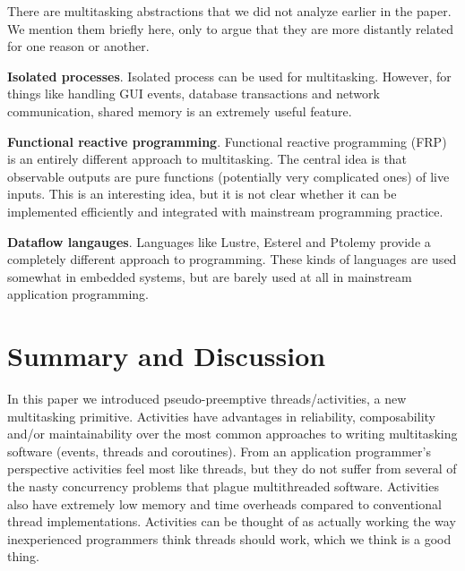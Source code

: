 \documentclass[9pt,preprint]{sigplanconf}
\begin{document}
There are multitasking abstractions that we did not analyze earlier in the paper.
We mention them briefly here, only to argue that they are more distantly related for one reason or another.

\textbf{Isolated processes}.
Isolated process can be used for multitasking.
However, for things like handling GUI events, database transactions and network communication, shared memory is an extremely useful feature.

\textbf{Functional reactive programming}.
Functional reactive programming (FRP) is an entirely different approach to multitasking.
The central idea is that observable outputs are pure functions (potentially very complicated ones) of live inputs.
This is an interesting idea, but it is not clear whether it can be implemented efficiently and integrated with mainstream programming practice.

\textbf{Dataflow langauges}.
Languages like Lustre, Esterel and Ptolemy provide a completely different approach to programming.
These kinds of languages are used somewhat in embedded systems, but are barely used at all in mainstream application programming.

\section{Summary and Discussion}

In this paper we introduced pseudo-preemptive threads/activities, a new multitasking primitive.
Activities have advantages in reliability, composability and/or maintainability over the most common approaches to writing multitasking software (events, threads and coroutines).
From an application programmer's perspective activities feel most like threads, but they do not suffer from several of the nasty concurrency problems that plague multithreaded software.
Activities also have extremely low memory and time overheads compared to conventional thread implementations.
Activities can be thought of as actually working the way inexperienced programmers think threads should work, which we think is a good thing.




% 






\end{document}
